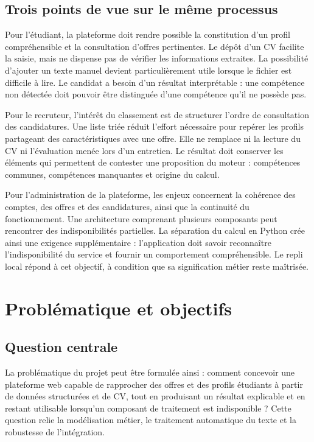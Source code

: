 \subsection{Trois points de vue sur le même processus}

Pour l'étudiant, la plateforme doit rendre possible la constitution d'un profil compréhensible et la consultation d'offres pertinentes. Le dépôt d'un CV facilite la saisie, mais ne dispense pas de vérifier les informations extraites. La possibilité d'ajouter un texte manuel devient particulièrement utile lorsque le fichier est difficile à lire. Le candidat a besoin d'un résultat interprétable : une compétence non détectée doit pouvoir être distinguée d'une compétence qu'il ne possède pas.

Pour le recruteur, l'intérêt du classement est de structurer l'ordre de consultation des candidatures. Une liste triée réduit l'effort nécessaire pour repérer les profils partageant des caractéristiques avec une offre. Elle ne remplace ni la lecture du CV ni l'évaluation menée lors d'un entretien. Le résultat doit conserver les éléments qui permettent de contester une proposition du moteur : compétences communes, compétences manquantes et origine du calcul.

Pour l'administration de la plateforme, les enjeux concernent la cohérence des comptes, des offres et des candidatures, ainsi que la continuité du fonctionnement. Une architecture comprenant plusieurs composants peut rencontrer des indisponibilités partielles. La séparation du calcul en Python crée ainsi une exigence supplémentaire : l'application doit savoir reconnaître l'indisponibilité du service et fournir un comportement compréhensible. Le repli local répond à cet objectif, à condition que sa signification métier reste maîtrisée.

\section{Problématique et objectifs}

\subsection{Question centrale}

La problématique du projet peut être formulée ainsi : comment concevoir une plateforme web capable de rapprocher des offres et des profils étudiants à partir de données structurées et de CV, tout en produisant un résultat explicable et en restant utilisable lorsqu'un composant de traitement est indisponible ? Cette question relie la modélisation métier, le traitement automatique du texte et la robustesse de l'intégration.

